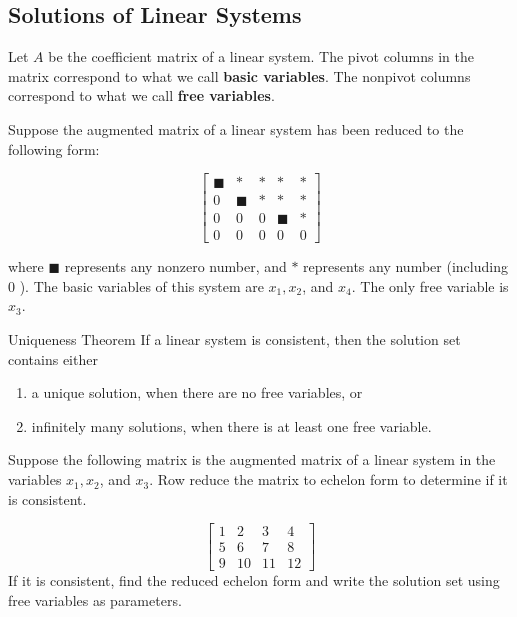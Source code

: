 \subsection*{Solutions of Linear Systems}

Let $A$ be the coefficient matrix of a linear system. The pivot columns in the matrix correspond to what we call \textbf{basic variables}. The nonpivot columns correspond to what we call \textbf{free variables}.

\begin{example} Suppose the augmented matrix of a linear system has been reduced to the following form:

\[
\left[\begin{array}{lllll}
\blacksquare & * & * & * & * \\
0 & \blacksquare & * & * & * \\
0 & 0 & 0 & \blacksquare & * \\
0 & 0 & 0 & 0 & 0
\end{array}\right]
\]

where $\blacksquare$ represents any nonzero number, and $*$ represents any number (including 0 ). The basic variables of this system are $x_1, x_2$, and $x_4$. The only free variable is $x_3$.

\end{example}


\begin{theorem}{Uniqueness Theorem}
    If a linear system is consistent, then the solution set contains either
    \begin{enumerate}[label=(\roman*)]
        \item a unique solution, when there are no free variables, or
        \item infinitely many solutions, when there is at least one free variable.
    \end{enumerate}
\end{theorem}

\begin{example} Suppose the following matrix is the augmented matrix of a linear system in the variables $x_1, x_2$, and $x_3$. Row reduce the matrix to echelon form to determine if it is consistent.

\[
\left[\begin{array}{cccc}
1 & 2 & 3 & 4 \\
5 & 6 & 7 & 8 \\
9 & 10 & 11 & 12
\end{array}\right]
\]
If it is consistent, find the reduced echelon form and write the solution set using free variables as parameters.
\end{example}

